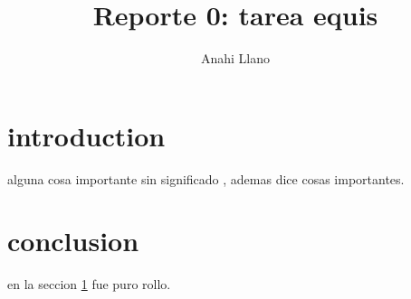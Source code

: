 \documentclass{article}
\title { Reporte 0: tarea equis}
\author{Anahi Llano}
\begin{document}
\maketitle

\section{introduction}\label{intro}

alguna cosa importante sin significado \citep{libro},
ademas \citet{art} dice cosas importantes.

\section{conclusion}

en la seccion \ref{intro} fue puro rollo.



\end{document}
